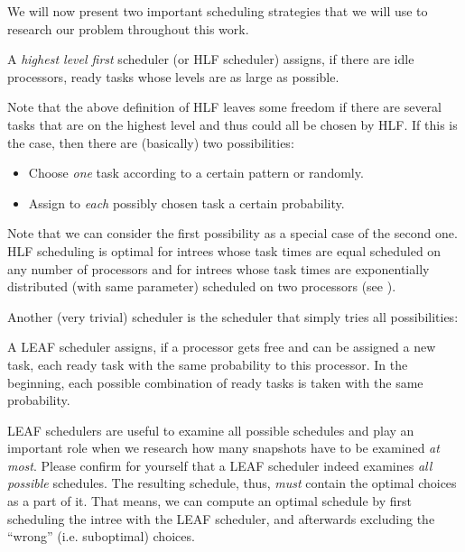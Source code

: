 We will now present two important scheduling strategies that we will use to research our problem throughout this work.

\begin{definition}
  A \emph{highest level first} scheduler (or HLF scheduler) assigns, if there are idle processors, ready tasks whose levels are as large as possible.
\end{definition}

Note that the above definition of HLF leaves some freedom if there are several tasks that are on the highest level and thus could all be chosen by HLF. If this is the case, then there are (basically) two possibilities:
\begin{itemize}
\item Choose \emph{one} task according to a certain pattern or randomly.
\item Assign to \emph{each} possibly chosen task a certain probability.
\end{itemize}

Note that we can consider the first possibility as a special case of the second one. HLF scheduling is optimal for intrees whose task times are equal scheduled on any number of processors \cite{hu:1961:hlfoptimalforknowntimesintree} and for intrees whose task times are exponentially distributed (with same parameter) scheduled on two processors (see \cite{chandyreynoldsshortpaper1975}). 

Another (very trivial) scheduler is the scheduler that simply tries all possibilities:

\begin{definition}
  A LEAF scheduler assigns, if a processor gets free and can be assigned a new task, each ready task with the same probability to this processor. In the beginning, each possible combination of ready tasks is taken with the same probability.
\end{definition}

LEAF schedulers are useful to examine all possible schedules and play an important role when we research how many snapshots have to be examined \emph{at most}. Please confirm for yourself that a LEAF scheduler indeed examines \emph{all possible} schedules. The resulting schedule, thus, \emph{must} contain the optimal choices as a part of it. That means, we can compute an optimal schedule by first scheduling the intree with the LEAF scheduler, and afterwards excluding the ``wrong'' (i.e. suboptimal) choices.

